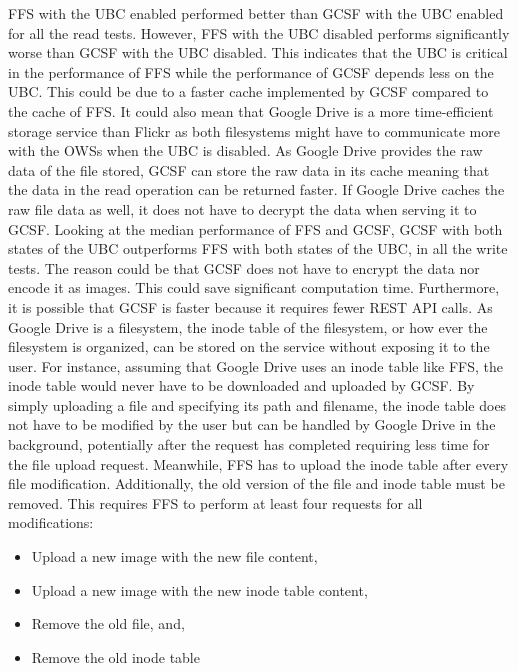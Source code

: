 \gls{FFS} with the \gls{UBC} enabled performed better than \gls{GCSF} with the \gls{UBC} enabled for all the read tests. However, \gls{FFS} with the \gls{UBC} disabled performs significantly worse than \gls{GCSF} with the \gls{UBC} disabled. This indicates that the \gls{UBC} is critical in the performance of \gls{FFS} while the performance of \gls{GCSF} depends less on the \gls{UBC}. This could be due to a faster cache implemented by \gls{GCSF} compared to the cache of \gls{FFS}. It could also mean that Google Drive is a more \mbox{time-efficient} storage service than Flickr as both filesystems might have to communicate more with the \gls{OWS}s when the \gls{UBC} is disabled. As Google Drive provides the raw data of the file stored, \gls{GCSF} can store the raw data in its cache meaning that the data in the read operation can be returned faster. If Google Drive caches the raw file data as well, it does not have to decrypt the data when serving it to \gls{GCSF}. Looking at the median performance of \gls{FFS} and \gls{GCSF}, \gls{GCSF} with both states of the \gls{UBC} outperforms \gls{FFS} with both states of the \gls{UBC}, in all the write tests. The reason could be that \gls{GCSF} does not have to encrypt the data nor encode it as images. This could save significant computation time. Furthermore, it is possible that \gls{GCSF} is faster because it requires fewer REST \gls{API} calls. As Google Drive is a filesystem, the inode table of the filesystem, or how ever the filesystem is organized, can be stored on the service without exposing it to the user. For instance, assuming that Google Drive uses an inode table like \gls{FFS}, the inode table would never have to be downloaded and uploaded by \gls{GCSF}. By simply uploading a file and specifying its path and filename, the inode table does not have to be modified by the user but can be handled by Google Drive in the background, potentially after the request has completed requiring less time for the file upload request. Meanwhile, \gls{FFS} has to upload the inode table after every file modification. Additionally, the old version of the file and inode table must be removed. This requires \gls{FFS} to perform at least four requests for all modifications:
\begin{itemize}
	\item Upload a new image with the new file content,
	\item Upload a new image with the new inode table content,
	\item Remove the old file, and,
	\item Remove the old inode table
\end{itemize}
